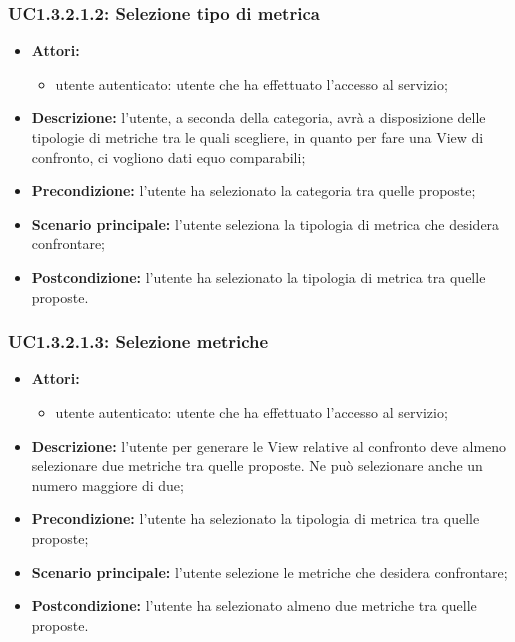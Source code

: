 \subsubsection{UC1.3.2.1.2: Selezione tipo di metrica}
\begin{itemize}
	\item \textbf{Attori:}
	\begin{itemize}
		\item utente autenticato: utente che ha effettuato l'accesso al servizio;
	\end{itemize}
	\item \textbf{Descrizione:} l'utente, a seconda della categoria, avrà a disposizione delle tipologie di metriche tra le quali scegliere, in quanto per fare una View di confronto, ci vogliono dati equo comparabili;
	\item \textbf{Precondizione:} l'utente ha selezionato la categoria tra quelle proposte;
	\item \textbf{Scenario principale:} l'utente seleziona la tipologia di metrica che desidera confrontare;
	\item \textbf{Postcondizione:} l'utente ha selezionato la tipologia di metrica tra quelle proposte.
\end{itemize}

\subsubsection{UC1.3.2.1.3: Selezione metriche}
\begin{itemize}
	\item \textbf{Attori:}
	\begin{itemize}
		\item utente autenticato: utente che ha effettuato l'accesso al servizio;
	\end{itemize}
	\item \textbf{Descrizione:} l'utente per generare le View relative al confronto deve almeno selezionare due metriche tra quelle proposte. Ne può selezionare anche un numero maggiore di due;
	\item \textbf{Precondizione:} l'utente ha selezionato la tipologia di metrica tra quelle proposte;
	\item \textbf{Scenario principale:} l'utente selezione le metriche che desidera confrontare;
	\item \textbf{Postcondizione:} l'utente ha selezionato almeno due metriche tra quelle proposte.
\end{itemize}


